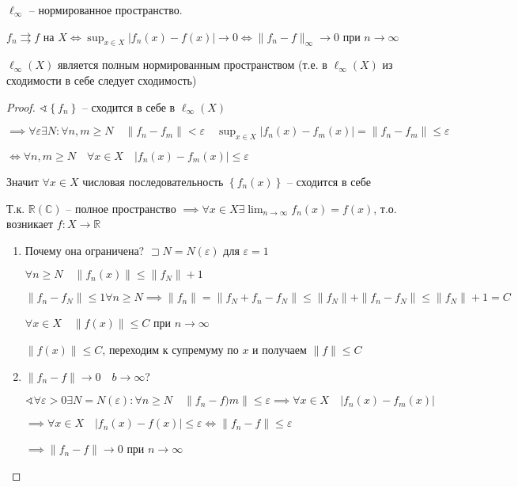 \documentclass{book}
\newcommand\R{\ensuremath{\mathbb{R}}}
\renewcommand\C{\ensuremath{\mathbb{C}}}
\theoremstyle{definition}
\begin{document}
    $\ell _{\infty }$ -- нормированное пространство.

    $f_n\rightrightarrows f$ на  $X \iff \sup _{x\in X}\left| f_n(x) - f(x) \right| \to 0 \iff  \|f_n - f\|_{\infty }\to 0$ при $n\to \infty $

    \begin{statement}
        $\ell_{\infty }(X)$ является полным нормированным пространством (т.е. в $\ell _{\infty }(X)$ из сходимости в себе следует сходимость)
    \end{statement}
    \begin{proof}
        $\sphericalangle \left\{ f_n \right\} $ -- сходится в себе в $\ell _{\infty }(X)$

        $\implies \forall \varepsilon\exists N: \forall n, m \geqslant N\quad \|f_n - f_m\|<\varepsilon\quad \sup_{x\in X}\left| f_n(x) - f_m(x) \right| =\|f_n - f_m\|\leqslant \varepsilon$

        $\iff \forall n, m\geqslant N\quad \forall x\in X\quad \left| f_n(x) - f_m(x) \right| \leqslant \varepsilon$

        Значит $\forall x\in X$ числовая последовательность $\left\{ f_n(x) \right\} $ -- сходится в себе

        Т.к. $\R(\C)$ -- полное пространство $\implies \forall x\in X \exists \lim_{n \to \infty} f_n(x) = f(x)$, т.о. возникает $f: X\to \R$

        \begin{enumerate}
            \item Почему она ограничена? $\sqsupset N = N(\varepsilon)$ для $\varepsilon = 1$

                $\forall n\geqslant N\quad \|f_n(x)\|\leqslant \|f_N\| + 1$ 

                $\|f_n-f_N\|\leqslant 1 \forall n\geqslant N \implies \|f_n\| = \|f_N + f_n - f_N\|\leqslant \|f_N\| + \|f_n-f_N\|\leqslant \|f_N\| + 1 = C$

                $\forall x\in X\quad \|f(x)\|\leqslant C$ при $n\to \infty $

                $\|f(x)\|\leqslant C$, переходим к супремуму по $x$ и получаем  $\|f\|\leqslant C$
            \item $\|f_n-f\|\to 0\quad b\to \infty $?

                $\sphericalangle \forall \varepsilon>0\exists N = N(\varepsilon): \forall n\geqslant N\quad \|f_n - f)m\|\leqslant \varepsilon \implies \forall x\in X \quad \left| f_n(x) - f_m(x) \right| $ 
                
                $\implies \forall x\in X\quad \left| f_n(x) - f(x) \right| \leqslant \varepsilon \iff  \|f_n - f\|\leqslant \varepsilon$

                $\implies \|f_n-f\|\to 0$ при $n\to \infty $
        \end{enumerate}
    \end{proof}
\end{document}
